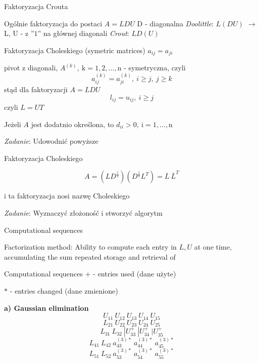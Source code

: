 \begin{frame}{Faktoryzacja Crouta}
\begin{exampleblock}{Ogólnie faktoryzacja do postaci $A=LDU$}
D - diagonalna \hspace{40mm } {\it Doolittle}: \hspace{10mm} $L(DU)$ \newline
\hspace*{55mm} $\rightarrow$ 
\newline
 L, U - z ''$1$'' na głównej diagonali \hspace{15mm} {\it Crout}: \hspace{11mm}  $LD(U)$
\newline 
\end{exampleblock}
\end{frame}
\begin{frame}{Faktoryzacja Choleskiego}
(symetric matrices) $a_{ij}=a_{ji}$

pivot z diagonali, $A^{(k)}, \ \mathrm{k}=1,2,\ldots,\mathrm{n}$ - symetryczna, czyli
$$
a_{ij}^{(k)}=a_{ji}^{(k)},\ i\geq j,\ j\geq k
$$
stąd dla faktoryzacji $A=LDU$
$$
l_{ij}=u_{ij},\ i\geq j
$$
czyli $L=UT$

Jeżeli $A$ jest dodatnio określona, to $d_{ii}>0, \ \mathrm{i}=1,\ldots,\mathrm{n}$
\begin{flushright}
{\it Zadanie}: Udowodnić powyższe 
\end{flushright}

\end{frame}
\begin{frame}{Faktoryzacja Choleskiego}
\begin{exampleblock}{}
$$
A=(LD^{\frac{1}{2}})(D^{\frac{1}{2}}L^{T})=\overline{L}\ \overline{L}^{T}
$$
\end{exampleblock}
i ta faktoryzacja nosi nazwę Choleskiego
\begin{flushright}
{\it Zadanie}: Wyznaczyć złożoność i stworzyć algorytm
\end{flushright}
\end{frame}
\begin{frame}{Computational sequences}
\begin{exampleblock}{Factorization method:}
Ability to compute each entry in $L,U$ at one time, accumulating the sum repeated storage and retrieval of 
\end{exampleblock}
 

\end{frame}
\begin{frame}{Computational sequences}
$+$ - entries used (dane użyte)

$*$ - entries changed (dane zmienione)

\textbf{ a) Gaussian elimination}
$$
U_{11}\ U_{12}\ U_{13}\ U_{14}\ U_{15}
$$
$$
L_{21}\ U_{22}\ U_{23}\ U_{24}\ U_{25}
$$
$$
L_{31}\ L_{32}\ |U_{33}^{+}\ |U_{34}^{+}\ |U_{35}^{+}
$$
$$
L_{41}\ L_{42}\ a_{43}^{(3)*}\ a_{44}^{(3)*}\ a_{45}^{(3)*}
$$
$$
L_{51}\ L_{52}\ a_{53}^{(3)*}\ a_{54}^{(3)*}\ a_{55}^{(3)*}
$$

\end{frame}
